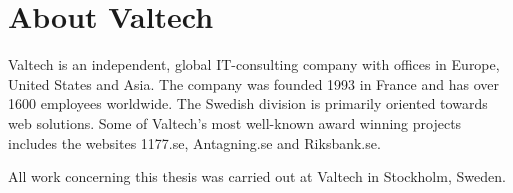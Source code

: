 \section{About Valtech}
Valtech is an independent, global IT-consulting company with offices in Europe, United States and Asia. The company was founded 1993 in France and has over 1600 employees worldwide. The Swedish division is primarily oriented towards web solutions. Some of Valtech’s most well-known award winning projects includes the websites 1177.se, Antagning.se and Riksbank.se.

All work concerning this thesis was carried out at Valtech in Stockholm, Sweden.
